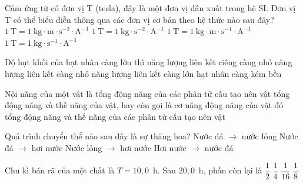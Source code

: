 	\begin{ex}%
		Cảm ứng từ có đơn vị T (tesla), đây là một đơn vị dẫn xuất trong hệ SI. Đơn vị T có thể biểu diễn thông qua các đơn vị cơ bản theo hệ thức nào sau đây?
		\choice
		{$1~\text{T}=1~\text{kg}\cdot\text{m}\cdot\text{s}^{-2}\cdot\text{A}^{-1}$}
		{\True $1~\text{T}=1~\text{kg}\cdot\text{s}^{-2}\cdot\text{A}^{-1}$}
		{$1~\text{T}=1~\text{kg}\cdot\text{m}\cdot\text{s}^{-1}\cdot\text{A}^{-1}$}
		{$1~\text{T}=1~\text{kg}\cdot\text{s}^{-1}\cdot\text{A}^{-1}$}
	\end{ex}

	\begin{ex}%
		Độ hụt khối của hạt nhân càng lớn thì
		\choice
		{năng lượng liên kết riêng càng nhỏ}
		{năng lượng liên kết càng nhỏ}
		{\True năng lượng liên kết càng lớn}
		{hạt nhân càng kém bền}
	\end{ex}

	\begin{ex}%
		Nội năng của một vật là
		\choice
		{tổng động năng của các phân tử cấu tạo nên vật}
		{tổng động năng và thế năng của vật, hay còn gọi là cơ năng}
		{động năng của vật đó}
		{\True tổng động năng và thế năng của các phân tử cấu tạo nên vật}
	\end{ex}

	\begin{ex}%
		Quá trình chuyển thể nào sau đây là sự thăng hoa?
		\choice
		{Nước đá $\to$ nước lỏng}
		{\True Nước đá $\to$ hơi nước}
		{Nước lỏng $\to$ hơi nước}
		{Hơi nước $\to$ nước đá}
	\end{ex}

	\begin{ex}%
		Chu kì bán rã của một chất là $T=10{,}0$~h. Sau $20{,}0$~h, phần còn lại là
		\choice
		{$\dfrac{1}{2}$}
		{\True $\dfrac{1}{4}$}
		{$\dfrac{1}{16}$}
		{$\dfrac{1}{8}$}
	\end{ex}


